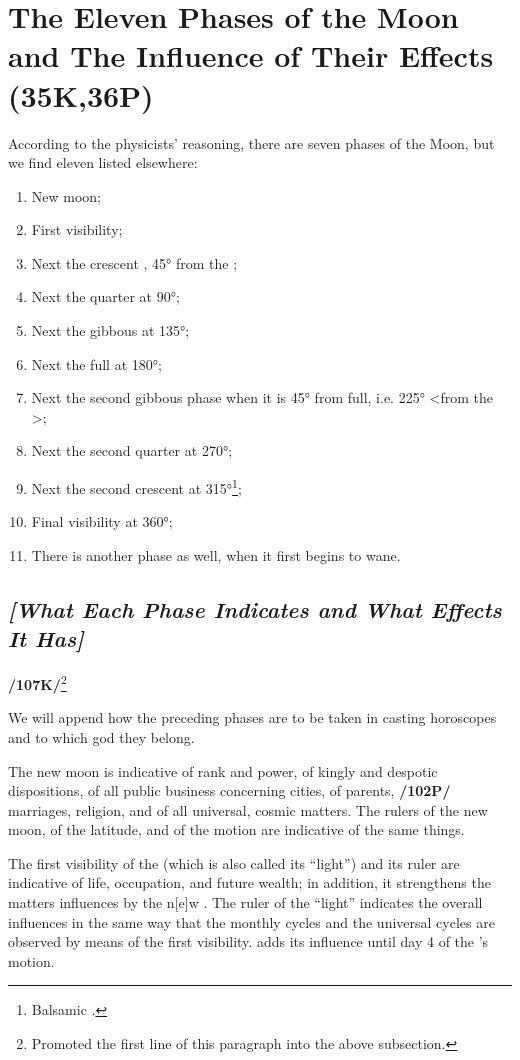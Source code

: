 \section{The Eleven Phases of the Moon and The Influence of Their Effects (35K,36P)}

According to the physicists’ reasoning, there are seven phases of the Moon, but we find eleven listed elsewhere:

\begin{enumerate}
\item New moon;
\item First visibility;
\item Next the crescent \Moon, 45° from the \Sun;
\item Next the quarter \Moon\xspace at 90°;
\item Next the gibbous \Moon\xspace at 135°;
\item Next the full \Moon\xspace at 180°;
\item Next the second gibbous phase when it is 45° from full, i.e. 225° <from the \Sun>;
\item Next the second quarter at 270°;
\item Next the second crescent at 315°\footnote{Balsamic \Moon.};
\item Final visibility at 360°;
\item There is another phase as well, when it first begins to wane.
\end{enumerate}

 \subsection{\textit{[What Each Phase Indicates and What Effects It Has]}}

\textbf{/107K/}\footnote{Promoted the first line of this paragraph into the above subsection.} 

We will append how the preceding phases are to be taken in casting horoscopes and to which god they belong.

The new moon is indicative of rank and power, of kingly and despotic dispositions, of all public business concerning cities, of parents, \textbf{/102P/} marriages, religion, and of all universal, cosmic matters. The rulers of the new moon, of the latitude, and of the motion are indicative of the same things. 

The first visibility of the \Moon\xspace (which is also called its “light”) and its ruler are indicative of life, occupation, and future wealth; in addition, it strengthens the matters influences by the n[e]w \Moon. The ruler of the “light” indicates the overall influences in the same way that the monthly cycles and the universal cycles are observed by means of the first visibility. \Mercury\xspace adds its influence until day 4 of the \Moon’s motion.


